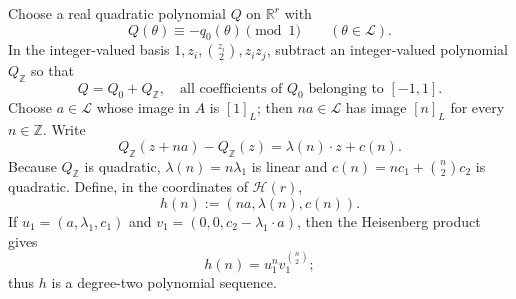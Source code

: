\documentclass[twoside]{aomart}
\makeatletter
\theoremstyle{paperplain}
\theoremstyle{paperdefinition}
\renewenvironment{proof}[1][\proofname]{\par\pushQED{\qed}%
  \normalfont\topsep6\p@\@plus3\p@\relax\trivlist
  \item[\hskip\labelsep\itshape #1\@addpunct{.}]\ignorespaces
}{\popQED\endtrivlist\@endpefalse}
\numberwithin{equation}{section}
\makeatother
\begin{document}
\begin{proof}
Choose a real quadratic polynomial $Q$ on $\mathbb R^r$ with
\[
 Q(\theta)\equiv-q_0(\theta)\pmod1\qquad(\theta\in\mathcal L).
\]
In the integer-valued basis
$1,z_i,\binom{z_i}{2},z_iz_j$, subtract an integer-valued polynomial
$Q_{\mathbb Z}$ so that
\begin{equation}
 Q=Q_0+Q_{\mathbb Z},
 \quad\text{all coefficients of $Q_0$ belonging to }[-1,1].       \label{inv:eq:lem73-quadratic-split}
\end{equation}
Choose $a\in\mathcal L$ whose image in $A$ is $[1]_L$; then $na\in\mathcal L$ has image $[n]_L$ for every $n\in\mathbb Z$.  Write
\[
 Q_{\mathbb Z}(z+na)-Q_{\mathbb Z}(z)=\lambda(n)\cdot z+c(n).
\]
Because $Q_{\mathbb Z}$ is quadratic, $\lambda(n)=n\lambda_1$ is linear
and $c(n)=n c_1+\binom n2c_2$ is quadratic.  Define, in the coordinates
of $\mathcal H(r)$,
\begin{equation*}
 h(n):=(na,\lambda(n),c(n)).                                    
\end{equation*}
If $u_1=(a,\lambda_1,c_1)$ and
$v_1=(0,0,c_2-\lambda_1\cdot a)$, then the Heisenberg product gives
\begin{equation*}
 h(n)=u_1^n v_1^{\binom n2};                                      
\end{equation*}
thus $h$ is a degree-two polynomial sequence.  


\end{proof}
\end{document}
